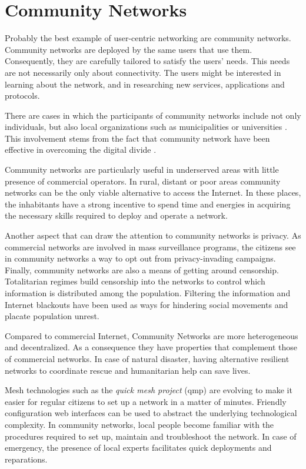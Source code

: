 \documentclass[journal]{IEEEtran}
\begin{document}
\section{Community Networks}
\label{sec:community-networks}

Probably the best example of user-centric networking are community networks.
Community networks are deployed by the same users that use them.
Consequently, they are carefully tailored to satisfy the users' needs.
This needs are not necessarily only about connectivity.
The users might be interested in learning about the network, and in researching  new services, applications and protocols.

There are cases in which the participants of community networks include not only individuals, but also local organizations such as municipalities or universities \cite{bogliolo2007uwc}.
This involvement stems from the fact that community network have been effective in overcoming the digital divide \cite{oliver2010wca}.

Community networks are particularly useful in underserved areas with little presence of commercial operators.
In rural, distant or poor areas community networks can be the only viable alternative to access the Internet.
In these places, the inhabitants have a strong incentive to spend time and energies in acquiring the necessary skills required to deploy and operate a network.

Another aspect that can draw the attention to community networks is privacy.
As commercial networks are involved in mass surveillance programs, the citizens see in community networks a way to opt out from privacy-invading campaigns.
Finally, community networks are also a means of getting around censorship.
Totalitarian regimes build censorship into the networks to control which information is distributed among the population.
Filtering the information and Internet blackouts have been used as ways for hindering social movements and placate population unrest. 

Compared to commercial Internet, Community Networks are more heterogeneous and decentralized.
As a consequence they have properties that complement those of commercial networks.
In case of natural disaster, having alternative resilient networks to coordinate rescue and humanitarian help can save lives.

Mesh technologies such as the \emph{quick mesh project} (qmp) are evolving to make it easier for regular citizens to set up a network in a matter of minutes.
Friendly configuration web interfaces can be used to abstract the underlying technological complexity.
In community networks, local people become familiar with the procedures required to set up, maintain and troubleshoot the network.
In case of emergency, the presence of local experts facilitates quick deployments and reparations. 
\end{document}
